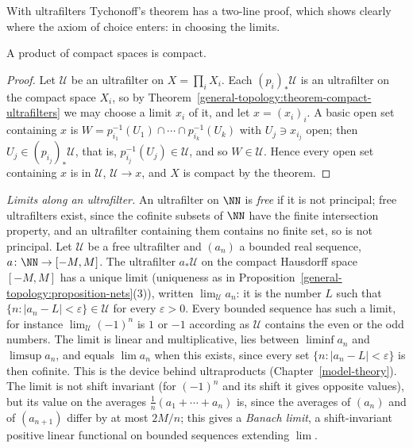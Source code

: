 With ultrafilters Tychonoff's theorem has a two-line proof, which shows clearly where the axiom of choice enters: in choosing the limits.

\begin{corollary}\label{general-topology:corollary-tychonoff-ultrafilters}
A product of compact spaces is compact.
\end{corollary}

\begin{proof}
Let $\mathcal{U}$ be an ultrafilter on $X = \prod_iX_i$. Each $(p_i)_*\mathcal{U}$ is an ultrafilter on the compact space $X_i$, so by Theorem~\ref{general-topology:theorem-compact-ultrafilters} we may choose a limit
$x_i$ of it, and let $x = (x_i)_i$. A basic open set containing $x$ is $W = p_{i_1}^{-1}(U_1) \cap \cdots \cap p_{i_k}^{-1}(U_k)$ with $U_j \ni x_{i_j}$ open; then $U_j \in (p_{i_j})_*\mathcal{U}$, that is,
$p_{i_j}^{-1}(U_j) \in \mathcal{U}$, and so $W \in \mathcal{U}$. Hence every open set containing $x$ is in $\mathcal{U}$, $\mathcal{U} \to x$, and $X$ is compact by the theorem.
\end{proof}

\begin{example}\label{general-topology:example-ultrafilter-limits}
\emph{Limits along an ultrafilter.} An ultrafilter on $\NN$ is \emph{free} if it is not principal; free ultrafilters exist, since the cofinite subsets of $\NN$ have the finite intersection property, and an
ultrafilter containing them contains no finite set, so is not principal. Let $\mathcal{U}$ be a free ultrafilter and $(a_n)$ a bounded real sequence, $a \colon \NN \to [-M, M]$. The ultrafilter
$a_*\mathcal{U}$ on the compact Hausdorff space $[-M, M]$ has a unique limit (uniqueness as in Proposition~\ref{general-topology:proposition-nets}(3)), written $\lim_{\mathcal{U}}a_n$: it is the number $L$ such that
$\{n : |a_n - L| < \varepsilon\} \in \mathcal{U}$ for every $\varepsilon > 0$. Every bounded sequence has such a limit, for instance $\lim_{\mathcal{U}}(-1)^n$ is $1$ or $-1$ according as $\mathcal{U}$ contains the
even or the odd numbers. The limit is linear and multiplicative, lies between $\liminf a_n$ and $\limsup a_n$, and equals $\lim a_n$ when this exists, since every set $\{n : |a_n - L| < \varepsilon\}$ is
then cofinite. This is the device behind ultraproducts (Chapter~\ref{model-theory}). The limit is not shift invariant (for $(-1)^n$ and its shift it gives opposite values), but its value on the
averages $\frac1n(a_1 + \cdots + a_n)$ is, since the averages of $(a_n)$ and of $(a_{n+1})$ differ by at most $2M/n$; this gives a \emph{Banach limit}, a shift-invariant positive linear functional on
bounded sequences extending $\lim$.
\end{example}

